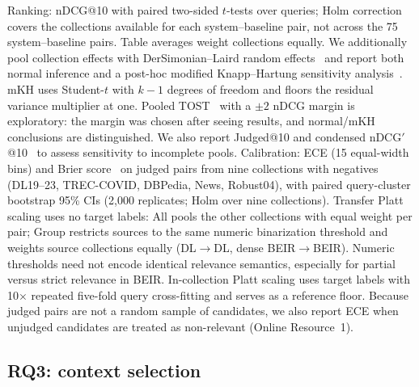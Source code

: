 Ranking: nDCG@10 with paired two-sided $t$-tests over queries; Holm correction~\cite{holm1979} covers the collections available for each system--baseline pair, not across the 75 system--baseline pairs. Table averages weight collections equally. We additionally pool collection effects with DerSimonian--Laird random effects~\cite{dersimonian1986} and report both normal inference and a post-hoc modified Knapp--Hartung sensitivity analysis~\cite{rover2015mkh}. mKH uses Student-$t$ with $k-1$ degrees of freedom and floors the residual variance multiplier at one. Pooled TOST~\cite{schuirmann1987tost} with a $\pm2$ nDCG margin is exploratory: the margin was chosen after seeing results, and normal/mKH conclusions are distinguished. We also report Judged@10 and condensed nDCG$'$@10~\cite{sakai2007alternatives} to assess sensitivity to incomplete pools.
Calibration: ECE (15 equal-width bins) and Brier score~\cite{brier1950} on judged pairs from nine collections with negatives (DL19--23, TREC-COVID, DBPedia, News, Robust04), with paired query-cluster bootstrap 95\% CIs (2,000 replicates; Holm over nine collections). Transfer Platt scaling uses no target labels: All pools the other collections with equal weight per pair; Group restricts sources to the same numeric binarization threshold and weights source collections equally (DL$\to$DL, dense BEIR$\to$BEIR). Numeric thresholds need not encode identical relevance semantics, especially for partial versus strict relevance in BEIR. In-collection Platt scaling uses target labels with 10$\times$ repeated five-fold query cross-fitting and serves as a reference floor.
Because judged pairs are not a random sample of candidates, we also report ECE when unjudged candidates are treated as non-relevant (Online Resource~1).

\subsection{RQ3: context selection}

